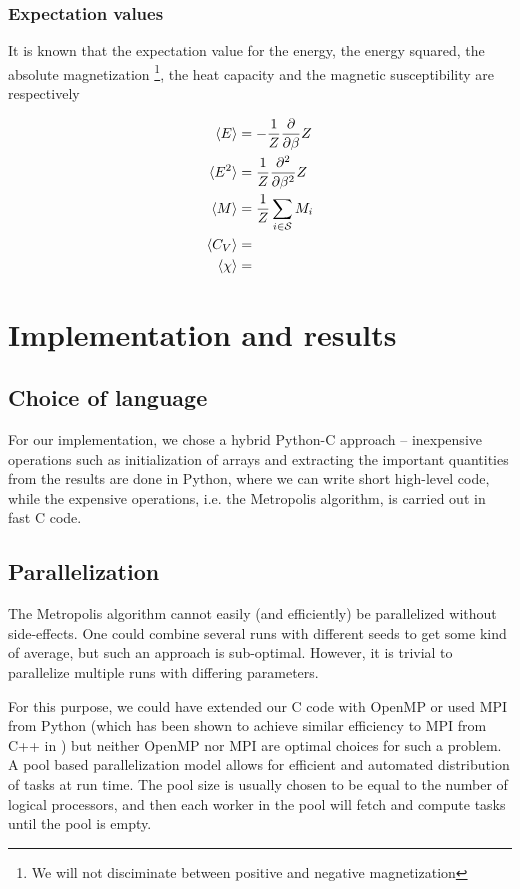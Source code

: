 \documentclass[a4paper]{article}
\begin{document}
\subsubsection{Expectation values}

It is known that the expectation value for the energy, the energy squared, the absolute magnetization \footnote{We will not disciminate between positive and negative magnetization}, the heat capacity and the magnetic susceptibility are respectively

\begin{align}
    \langle E \rangle &= - \frac{1}{Z} \frac{\partial }{\partial \beta} Z \\
    \langle E^2 \rangle &= \frac{1}{Z} \frac{\partial^2}{\partial \beta^2} Z\\
    \langle M \rangle &= \frac{1}{Z} \sum_{i \in {\mathcal{S}}} M_i\\
    \langle C_V \rangle &= \\
    \langle \chi \rangle &= \\
\end{align}


\section{Implementation and results}\label{sec:implementation_and_results}
\subsection{Choice of language}
For our implementation, we chose a hybrid Python-C approach -- inexpensive operations such as initialization of arrays and extracting the important quantities from the results are done in Python, where we can write short high-level code, while the expensive operations, i.e. the Metropolis algorithm, is carried out in fast C code.

\subsection{Parallelization}
The Metropolis algorithm cannot easily (and efficiently) be parallelized without side-effects. One could combine several runs with different seeds to get some kind of average, but such an approach is sub-optimal. However, it is trivial to parallelize multiple runs with differing parameters.

For this purpose, we could have extended our C code with OpenMP or used MPI from Python (which has been shown to achieve similar efficiency to MPI from C++ in \cite{mortensen_langtangen_hpc_python}) but neither OpenMP nor MPI are optimal choices for such a problem. A pool based parallelization model allows for efficient and automated distribution of tasks at run time. The pool size is usually chosen to be equal to the number of logical processors, and then each worker in the pool will fetch and compute tasks until the pool is empty.
\end{document}
